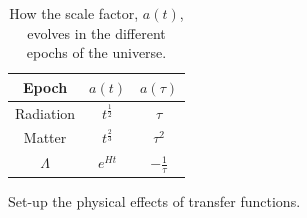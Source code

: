     \begin{table}[h!]
    \begin{center}
        \begin{tabular}{ c c c }
            Epoch & $a(t)$ & $a(\tau)$ \\ 
            \toprule
            Radiation & $t^{\frac{1}{2}}$ & $\tau$ \\
            Matter & $t^{\frac{2}{3}}$ & $\tau^2$ \\
            $\Lambda$ & $e^{Ht}$ & $-\frac{1}{\tau}$
        \end{tabular}\caption{
            How the scale factor, $a(t)$, evolves in the
            different epochs of the universe.
        }\label{lcdm_dep_table}
    \end{center}
    \end{table}


    Set-up the physical effects of transfer functions.


